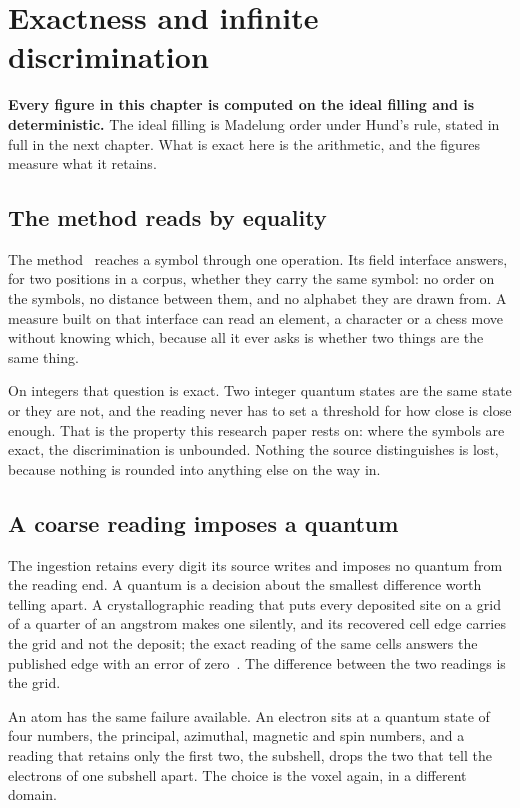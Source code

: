 \chapter{Exactness and infinite discrimination}

\textbf{Every figure in this chapter is computed on the ideal filling and is deterministic.} The ideal
filling is Madelung order under Hund's rule, stated in full in the next chapter. What is exact here is
the arithmetic, and the figures measure what it retains.

\section{The method reads by equality}

The method~\cite{src:Quigg-orior-workbook} reaches a symbol through one operation. Its field
interface answers, for two positions in a corpus, whether they carry the same symbol: no order on the
symbols, no distance between them, and no alphabet they are drawn from. A measure built on that
interface can read an element, a character or a chess move without knowing which, because all it ever
asks is whether two things are the same thing.

On integers that question is exact. Two integer quantum states are the same state or they are not,
and the reading never has to set a threshold for how close is close enough. That is the property this
research paper rests on: where the symbols are exact, the discrimination is unbounded. Nothing the
source distinguishes is lost, because nothing is rounded into anything else on the way in.

\section{A coarse reading imposes a quantum}

The ingestion retains every digit its source writes and imposes no quantum from the reading end. A
quantum is a decision about the smallest difference worth telling apart. A crystallographic reading
that puts every deposited site on a grid of a quarter of an angstrom makes one silently, and its
recovered cell edge carries the grid and not the deposit; the exact reading of the same cells answers
the published edge with an error of zero~\cite{src:Quigg-crystallography}. The difference between
the two readings is the grid.

An atom has the same failure available. An electron sits at a quantum state of four numbers, the
principal, azimuthal, magnetic and spin numbers, and a reading that retains only the first two, the
subshell, drops the two that tell the electrons of one subshell apart. The choice is the voxel again,
in a different domain.

